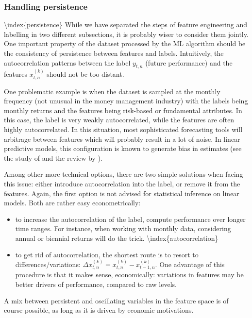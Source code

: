 \subsubsection{Handling persistence}\label{pers}

{\textbackslash}index\{persistence\}
While we have separated the steps of feature engineering and labelling in two different subsections, it is probably wiser to consider them jointly. One important property of the dataset processed by the ML algorithm should be the consistency of persistence between features and labels. Intuitively, the autocorrelation patterns between the label $y_{t,n}$ (future performance) and the features $x_{t,n}^{(k)}$ should not be too distant.

One problematic example is when the dataset is sampled at the monthly frequency (not unusual in the money management industry) with the labels being monthly returns and the features being risk-based or fundamental attributes. In this case, the label is very weakly autocorrelated, while the features are often highly autocorrelated. In this situation, most sophisticated forecasting tools will arbitrage between features which will probably result in a lot of noise. In linear predictive models, this configuration is known to generate bias in estimates (see the study of \cite{stambaugh1999predictive} and the review by \cite{gonzalo2018predictive}).

Among other more technical options, there are two simple solutions when facing this issue: either introduce autocorrelation into the label, or remove it from the features. Again, the first option is not advised for statistical inference on linear models. Both are rather easy econometrically:

\begin{itemize}
\item to increase the autocorrelation of the label, compute performance over longer time ranges. For instance, when working with monthly data, considering annual or biennial returns will do the trick. {\textbackslash}index\{autocorrelation\}
\item to get rid of autocorrelation, the shortest route is to resort to differences/variations: $\Delta x_{t,n}^{(k)}=x_{t,n}^{(k)} -x_{t -1,n}^{(k)}$. One advantage of this procedure is that it makes sense, economically: variations in features may be better drivers of performance, compared to raw levels.
\end{itemize}

A mix between persistent and oscillating variables in the feature space is of course possible, as long as it is driven by economic motivations.

